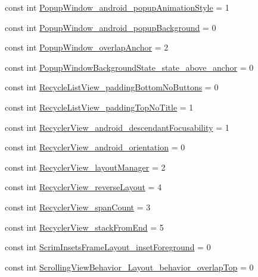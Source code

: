 \begin{CompactItemize}
\item 
const int \hyperlink{class__2doo_1_1_droid_1_1_resource_1_1_styleable_6d540fe58048121de7e1b7b07689b986}{PopupWindow\_\-android\_\-popupAnimationStyle} = 1
\item 
const int \hyperlink{class__2doo_1_1_droid_1_1_resource_1_1_styleable_634be5c3fbd38cdb92849f46e189eca7}{PopupWindow\_\-android\_\-popupBackground} = 0
\item 
const int \hyperlink{class__2doo_1_1_droid_1_1_resource_1_1_styleable_16b7bba4c17d2dddfae8e7bfe140f86f}{PopupWindow\_\-overlapAnchor} = 2
\item 
const int \hyperlink{class__2doo_1_1_droid_1_1_resource_1_1_styleable_74c8c36ede5bcf8ce51490025b63c689}{PopupWindowBackgroundState\_\-state\_\-above\_\-anchor} = 0
\item 
const int \hyperlink{class__2doo_1_1_droid_1_1_resource_1_1_styleable_239e4571ae4b1e9a7e20409abc001e86}{RecycleListView\_\-paddingBottomNoButtons} = 0
\item 
const int \hyperlink{class__2doo_1_1_droid_1_1_resource_1_1_styleable_c93a689c4367eb8de32d24465993d052}{RecycleListView\_\-paddingTopNoTitle} = 1
\item 
const int \hyperlink{class__2doo_1_1_droid_1_1_resource_1_1_styleable_752b0579cbcb848d6a48d557d83f20a4}{RecyclerView\_\-android\_\-descendantFocusability} = 1
\item 
const int \hyperlink{class__2doo_1_1_droid_1_1_resource_1_1_styleable_fb3104529f4ac028e3d71464ebfe1adb}{RecyclerView\_\-android\_\-orientation} = 0
\item 
const int \hyperlink{class__2doo_1_1_droid_1_1_resource_1_1_styleable_70851d131f2db3c6ca2c4bfa409925ac}{RecyclerView\_\-layoutManager} = 2
\item 
const int \hyperlink{class__2doo_1_1_droid_1_1_resource_1_1_styleable_165a7fea8103da918f061eda0a208127}{RecyclerView\_\-reverseLayout} = 4
\item 
const int \hyperlink{class__2doo_1_1_droid_1_1_resource_1_1_styleable_45030552231ea482b6d99d7e1f08635f}{RecyclerView\_\-spanCount} = 3
\item 
const int \hyperlink{class__2doo_1_1_droid_1_1_resource_1_1_styleable_34e25eaf77114ea5d082af8bfd445458}{RecyclerView\_\-stackFromEnd} = 5
\item 
const int \hyperlink{class__2doo_1_1_droid_1_1_resource_1_1_styleable_b106f430adef75a85c4171e438c07ad4}{ScrimInsetsFrameLayout\_\-insetForeground} = 0
\item 
const int \hyperlink{class__2doo_1_1_droid_1_1_resource_1_1_styleable_1c79d9a0512a38dc65bb3b4802619676}{ScrollingViewBehavior\_\-Layout\_\-behavior\_\-overlapTop} = 0

\end{CompactItemize}
